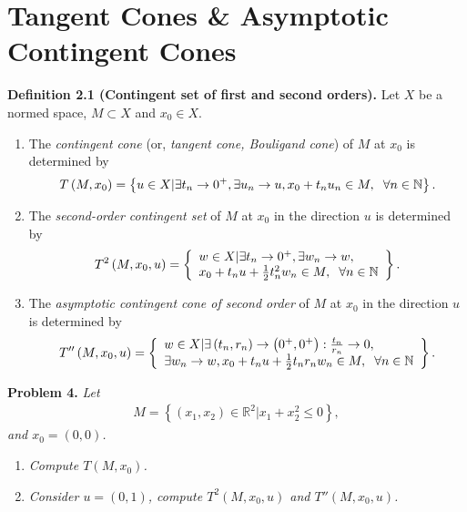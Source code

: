\documentclass[a4paper]{article}
\numberwithin{equation}{section}
\begin{document}
\section{Tangent Cones \& Asymptotic Contingent Cones}
\textbf{Definition 2.1 (Contingent set of first and second orders).} Let $X$ be a normed space, $M\subset X$ and $x_0\in X$.
\begin{enumerate}
\item The \textit{contingent cone} (or, \textit{tangent cone, Bouligand cone}) of $M$ at $x_0$ is determined by
\begin{align}
\label{2.1}
T\left( {M,{x_0}} \right) = \left\{ {u \in X|\exists {t_n} \to {0^ + },\exists {u_n} \to u,{x_0} + {t_n}{u_n} \in M,\hspace{0.2cm}\forall n \in \mathbb{N}} \right\}. 
\end{align}
\item The \textit{second-order contingent set} of $M$ at $x_0$ in the direction $u$ is determined by
\begin{align}
\label{2.2}
{T^2}\left( {M,{x_0},u} \right) = \left\{ \begin{array}{l}
w \in X|\exists {t_n} \to {0^ + },\exists {w_n} \to w,\\
{x_0} + {t_n}u + \frac{1}{2}t_n^2{w_n} \in M,\hspace{0.2cm}  \forall n \in \mathbb{N}
\end{array} \right\}.
\end{align} 
\item The \textit{asymptotic contingent cone of second order} of $M$ at $x_0$ in the direction $u$ is determined by
\begin{align}
\label{2.3}
T''\left( {M,{x_0},u} \right) = \left\{ \begin{array}{l}
w \in X|\exists \left( {{t_n},{r_n}} \right) \to \left( {{0^ + }{{,0}^ + }} \right):\frac{{{t_n}}}{{{r_n}}} \to 0,\\
\exists {w_n} \to w,{x_0} + {t_n}u + \frac{1}{2}{t_n}{r_n}{w_n} \in M, \hspace{0.2cm} \forall n \in \mathbb{N}
\end{array} \right\}.
\end{align}
\end{enumerate}
\textbf{Problem 4.} \textit{Let}
\begin{align}
M = \left\{ {\left( {{x_1},{x_2}} \right) \in {\mathbb{R}^2}|{x_1} + x_2^2 \le 0} \right\},
\end{align}
\textit{and $x_0=\left(0,0\right)$.}
\begin{enumerate}
\item \textit{Compute $T\left(M,x_0\right)$.}
\item \textit{Consider $u=\left(0,1\right)$, compute ${T^2}\left( {M,{x_0},u} \right)$ and $T''\left( {M,{x_0},u} \right)$.}
\end{enumerate}
\end{document}
